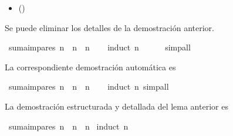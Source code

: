 \begin{isabellebody}
\begin{isamarkuptext}
\begin{itemize}
  \item[]  
          \hfill ()
  \end{itemize}%
\end{isamarkuptext}\isamarkuptrue%
%
\begin{isamarkuptext}%
Se puede eliminar los detalles de la demostración anterior.%
\end{isamarkuptext}\isamarkuptrue%
\isamarkupfalse%
\ {\isachardoublequoteopen}suma{\isacharunderscore}impares\ n\ {\isacharequal}\ n\ {\isacharasterisk}\ n{\isachardoublequoteclose}\isanewline
%
\isadelimproof
\ \ %
\endisadelimproof
%
\isatagproof
{}\isamarkupfalse%
\ {\isacharparenleft}induct\ n{\isacharparenright}\ \isanewline
\ \ \ \isamarkupfalse%
\ simp{\isacharunderscore}all\isanewline
\ \ \isamarkupfalse%
%
\endisatagproof
{\isafoldproof}%
%
\isadelimproof
%
\endisadelimproof
%
\isadelimdocument
%
\endisadelimdocument
%
\isatagdocument
%
\isamarkuptrue%
%
\endisatagdocument
{\isafolddocument}%
%
\isadelimdocument
%
\endisadelimdocument
%
\begin{isamarkuptext}%
La correspondiente demostración automática es%
\end{isamarkuptext}\isamarkuptrue%
\isamarkupfalse%
\ {\isachardoublequoteopen}suma{\isacharunderscore}impares\ n\ {\isacharequal}\ n\ {\isacharasterisk}\ n{\isachardoublequoteclose}\isanewline
%
\isadelimproof
\ \ %
\endisadelimproof
%
\isatagproof
{}\isamarkupfalse%
\ {\isacharparenleft}induct\ n{\isacharparenright}\ simp{\isacharunderscore}all%
\endisatagproof
{\isafoldproof}%
%
\isadelimproof
%
\endisadelimproof
%
\isadelimdocument
%
\endisadelimdocument
%
\isatagdocument
%
\isamarkuptrue%
%
\endisatagdocument
{\isafolddocument}%
%
\isadelimdocument
%
\endisadelimdocument
%
\begin{isamarkuptext}%
La demostración estructurada y detallada del lema anterior es%
\end{isamarkuptext}\isamarkuptrue%
\isamarkupfalse%
\ {\isachardoublequoteopen}suma{\isacharunderscore}impares\ n\ {\isacharequal}\ n\ {\isacharasterisk}\ n{\isachardoublequoteclose}\isanewline
%
\isadelimproof
%
\endisadelimproof
%
\isatagproof
{}\isamarkupfalse%
\ {\isacharparenleft}induct\ n{\isacharparenright}\isanewline

\end{isabellebody}
